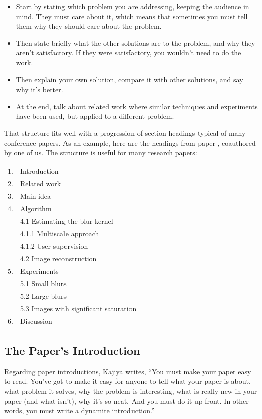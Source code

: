\begin{itemize}
\item Start by stating which problem you are addressing, keeping the  
  audience in mind.  They must care about it, which means that sometimes 
  you must tell them why they should care about the problem. 
  
\item Then state briefly what the other solutions are to the problem, and why they aren't satisfactory.  If they were satisfactory, you wouldn't need to  do the work.  

\item Then explain your own solution, compare it with other solutions, and say why it's better.  

\item At the end, talk about related work where similar techniques and experiments have been used, but applied to a different problem.  
\end{itemize}

That structure fits well with a progression of section headings typical of  many conference papers.  As an example, here are the headings from paper \cite{Fergus2006}, coauthored by one of us.  The structure is useful for many research papers:

\begin{tabular}{ll}
1. & Introduction \\
2. & Related work \\
3. & Main idea \\
4. & Algorithm \\
& 4.1 Estimating the blur kernel \\
& \hspace{1cm} 4.1.1 Multiscale approach \\
& \hspace{1cm} 4.1.2 User supervision \\
& 4.2 Image reconstruction \\
5. & Experiments \\
& 5.1 Small blurs \\
& 5.2 Large blurs \\
& 5.3 Images with significant saturation \\
6. & Discussion \\
\end{tabular}





\subsection{The Paper's Introduction}
Regarding paper introductions, Kajiya \cite{Kajiya1993} writes,
``You must make your paper easy to read. You've got to make it easy for anyone to tell what your paper is about, what problem it solves, why the problem is interesting, what is really new in your paper (and what isn't), why it's so neat. And you must do it up front. In other words, you must write a dynamite introduction.''

